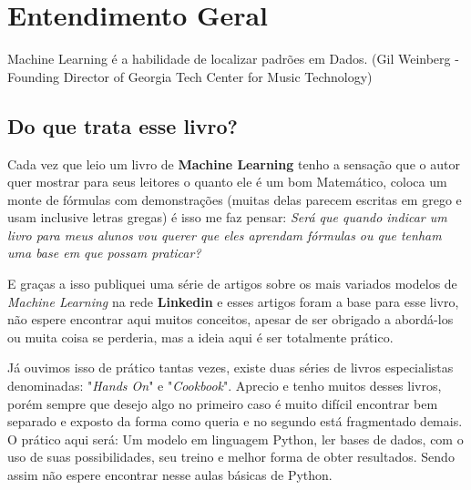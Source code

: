 \chapter{Entendimento Geral}

\begin{remark}
Machine Learning é a habilidade de localizar padrões em Dados. (Gil Weinberg - Founding Director of Georgia Tech Center for Music Technology) 
\end{remark}

\section{Do que trata esse livro?}
Cada vez que leio um livro de \textbf{Machine Learning} tenho a sensação que o autor quer mostrar para seus leitores o quanto ele é um bom Matemático, coloca um monte de fórmulas com demonstrações (muitas delas parecem escritas em grego e usam inclusive letras gregas) é isso me faz pensar: \textit{Será que quando indicar um livro para meus alunos vou querer que eles aprendam fórmulas ou que tenham uma base em que possam praticar?} 

E graças a isso publiquei uma série de artigos sobre os mais variados modelos de \textit{Machine Learning} na rede \textbf{Linkedin} e esses artigos foram a base para esse livro, não espere encontrar aqui muitos conceitos, apesar de ser obrigado a abordá-los ou muita coisa se perderia, mas a ideia aqui é ser totalmente prático.

Já ouvimos isso de prático tantas vezes, existe duas séries de livros especialistas denominadas: "\textit{Hands On}" e "\textit{Cookbook}". Aprecio e tenho muitos desses livros, porém sempre que desejo algo no primeiro caso é muito difícil encontrar bem separado e exposto da forma como queria e no segundo está fragmentado demais. O prático aqui será: Um modelo em linguagem Python, ler bases de dados, com o uso de suas possibilidades, seu treino e melhor forma de obter resultados. Sendo assim não espere encontrar nesse aulas básicas de Python.

